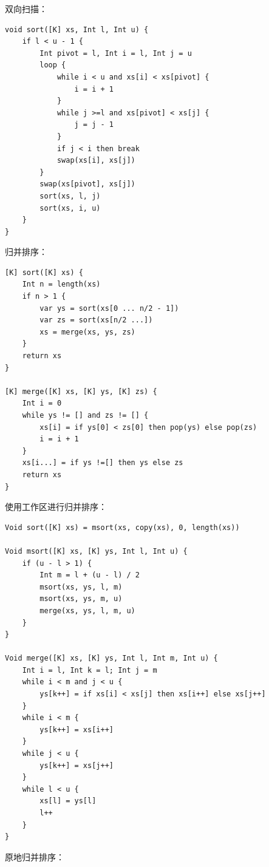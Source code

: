 \documentclass[b5paper]{ctexart}
\begin{document}
双向扫描：

\begin{lstlisting}[language = Bourbaki]
void sort([K] xs, Int l, Int u) {
    if l < u - 1 {
        Int pivot = l, Int i = l, Int j = u
        loop {
            while i < u and xs[i] < xs[pivot] {
                i = i + 1
            }
            while j >=l and xs[pivot] < xs[j] {
                j = j - 1
            }
            if j < i then break
            swap(xs[i], xs[j])
        }
        swap(xs[pivot], xs[j])
        sort(xs, l, j)
        sort(xs, i, u)
    }
}
\end{lstlisting}

归并排序：

\begin{lstlisting}[language = Bourbaki]
[K] sort([K] xs) {
    Int n = length(xs)
    if n > 1 {
        var ys = sort(xs[0 ... n/2 - 1])
        var zs = sort(xs[n/2 ...])
        xs = merge(xs, ys, zs)
    }
    return xs
}

[K] merge([K] xs, [K] ys, [K] zs) {
    Int i = 0
    while ys != [] and zs != [] {
        xs[i] = if ys[0] < zs[0] then pop(ys) else pop(zs)
        i = i + 1
    }
    xs[i...] = if ys !=[] then ys else zs
    return xs
}
\end{lstlisting}

使用工作区进行归并排序：

\begin{lstlisting}[language = Bourbaki]
Void sort([K] xs) = msort(xs, copy(xs), 0, length(xs))

Void msort([K] xs, [K] ys, Int l, Int u) {
    if (u - l > 1) {
        Int m = l + (u - l) / 2
        msort(xs, ys, l, m)
        msort(xs, ys, m, u)
        merge(xs, ys, l, m, u)
    }
}

Void merge([K] xs, [K] ys, Int l, Int m, Int u) {
    Int i = l, Int k = l; Int j = m
    while i < m and j < u {
        ys[k++] = if xs[i] < xs[j] then xs[i++] else xs[j++]
    }
    while i < m {
        ys[k++] = xs[i++]
    }
    while j < u {
        ys[k++] = xs[j++]
    }
    while l < u {
        xs[l] = ys[l]
        l++
    }
}
\end{lstlisting}

原地归并排序：
\end{document}
